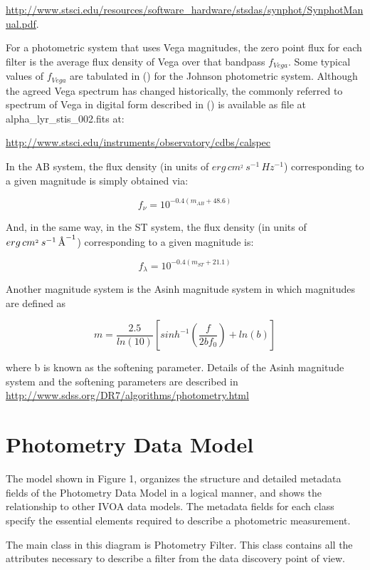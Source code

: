 \documentclass[11pt,a4paper]{ivoa}
\newcommand{\angstrom}{\mbox{\normalfont\AA}}
\begin{document}
\url{http://www.stsci.edu/resources/software_hardware/stsdas/synphot/SynphotManual.pdf}.
\par

For a photometric system that uses Vega magnitudes, the zero point flux for each filter is the average flux density of Vega over that bandpass $f_{Vega}$. Some typical values of $f_{Vega}$ are tabulated in (\citep{2001eaa..book.....M}) for the Johnson photometric system. Although the agreed Vega spectrum has changed historically, the commonly referred to spectrum of Vega in digital form described in (\citep{2004AJ....127.3508B}) is available as file at alpha\_lyr\_stis\_002.fits at:\par
\url{http://www.stsci.edu/instruments/observatory/cdbs/calspec}
\par

In the AB system, the flux density (in units of $erg\, cm^{_2}\, s^{-1}\, Hz^{-1}$) corresponding to a given magnitude is simply obtained via:
\par
\[
f_{\nu} = 10^{-0.4(m_{AB}+48.6)}
\]

And, in the same way, in the ST system, the flux density (in units of $erg\, cm^{_2}\, s^{-1}\, \angstrom^{-1}$) corresponding to a given magnitude is:
\par
\[
f_{\lambda} = 10^{-0.4(m_{ST}+21.1)}
\]

Another magnitude system is the Asinh magnitude system in which magnitudes are defined as
\par
\[
m = \frac{2.5}{ln(10)} \left[ sinh^{-1}(\frac{f}{2bf_0}) +ln(b) \right]
\]


where b is known as the softening parameter. Details of the Asinh magnitude system and the softening parameters are described in \url{http://www.sdss.org/DR7/algorithms/photometry.html}
\par

\section{Photometry Data Model} \label{datamodel}
The model shown in Figure 1, organizes the structure and detailed metadata fields of the Photometry Data Model in a logical manner, and shows the relationship to other IVOA data models. The metadata fields for each class specify the essential elements required to describe a photometric measurement.
\par

The main class in this diagram is Photometry Filter. This class contains all the attributes necessary to describe a filter from the data discovery point of view.
\par
\end{document}
